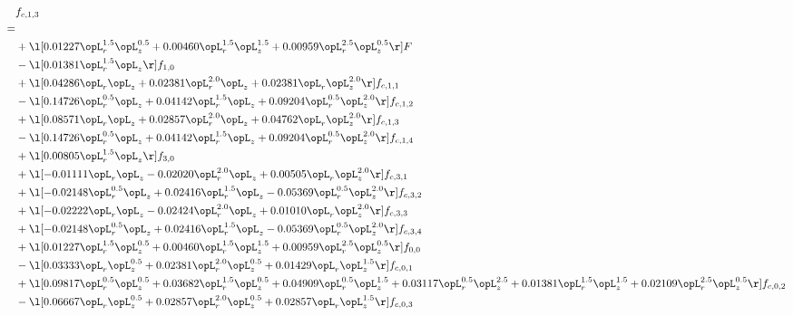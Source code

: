 \begin{alignat}{2} 
\label{eq:f_13_1} 
& f_{c,1,3} \nonumber \\ 
 = \\ 
& + \l[  0.01227 \opL_r^{1.5} \opL_z^{0.5} +  0.00460 \opL_r^{1.5} \opL_z^{1.5} +  0.00959 \opL_r^{2.5} \opL_z^{0.5}  \r] F \nonumber \\ 
& - \l[  0.01381 \opL_r^{1.5} \opL_z  \r] f_{1,0} \nonumber \\ 
& + \l[  0.04286 \opL_r \opL_z +  0.02381 \opL_r^{2.0} \opL_z +  0.02381 \opL_r \opL_z^{2.0}  \r] f_{c,1,1} \nonumber \\ 
& - \l[  0.14726 \opL_r^{0.5} \opL_z +  0.04142 \opL_r^{1.5} \opL_z +  0.09204 \opL_r^{0.5} \opL_z^{2.0}  \r] f_{c,1,2} \nonumber \\ 
& + \l[  0.08571 \opL_r \opL_z +  0.02857 \opL_r^{2.0} \opL_z +  0.04762 \opL_r \opL_z^{2.0}  \r] f_{c,1,3} \nonumber \\ 
& - \l[  0.14726 \opL_r^{0.5} \opL_z +  0.04142 \opL_r^{1.5} \opL_z +  0.09204 \opL_r^{0.5} \opL_z^{2.0}  \r] f_{c,1,4} \nonumber \\ 
& + \l[  0.00805 \opL_r^{1.5} \opL_z  \r] f_{3,0} \nonumber \\ 
& + \l[  -0.01111 \opL_r \opL_z   -0.02020 \opL_r^{2.0} \opL_z +  0.00505 \opL_r \opL_z^{2.0}  \r] f_{c,3,1} \nonumber \\ 
& + \l[  -0.02148 \opL_r^{0.5} \opL_z +  0.02416 \opL_r^{1.5} \opL_z   -0.05369 \opL_r^{0.5} \opL_z^{2.0}  \r] f_{c,3,2} \nonumber \\ 
& + \l[  -0.02222 \opL_r \opL_z   -0.02424 \opL_r^{2.0} \opL_z +  0.01010 \opL_r \opL_z^{2.0}  \r] f_{c,3,3} \nonumber \\ 
& + \l[  -0.02148 \opL_r^{0.5} \opL_z +  0.02416 \opL_r^{1.5} \opL_z   -0.05369 \opL_r^{0.5} \opL_z^{2.0}  \r] f_{c,3,4} \nonumber \\ 
& + \l[  0.01227 \opL_r^{1.5} \opL_z^{0.5} +  0.00460 \opL_r^{1.5} \opL_z^{1.5} +  0.00959 \opL_r^{2.5} \opL_z^{0.5}  \r] f_{0,0} \nonumber \\ 
& - \l[  0.03333 \opL_r \opL_z^{0.5} +  0.02381 \opL_r^{2.0} \opL_z^{0.5} +  0.01429 \opL_r \opL_z^{1.5}  \r] f_{c,0,1} \nonumber \\ 
& + \l[  0.09817 \opL_r^{0.5} \opL_z^{0.5} +  0.03682 \opL_r^{1.5} \opL_z^{0.5} +  0.04909 \opL_r^{0.5} \opL_z^{1.5} +  0.03117 \opL_r^{0.5} \opL_z^{2.5} +  0.01381 \opL_r^{1.5} \opL_z^{1.5} +  0.02109 \opL_r^{2.5} \opL_z^{0.5}  \r] f_{c,0,2} \nonumber \\ 
& - \l[  0.06667 \opL_r \opL_z^{0.5} +  0.02857 \opL_r^{2.0} \opL_z^{0.5} +  0.02857 \opL_r \opL_z^{1.5}  \r] f_{c,0,3} \nonumber \\ 

\end{alignat}
